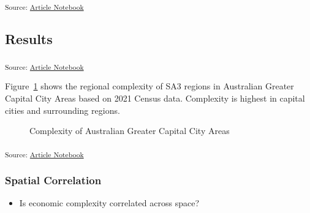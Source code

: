 \documentclass[
]{agujournal2019}
\providecommand{\tightlist}{%
  \setlength{\itemsep}{0pt}\setlength{\parskip}{0pt}}\usepackage{longtable,booktabs,array}
\begin{document}
\textsubscript{Source:
\href{https://aiti-flinders.github.io/sirp-complexity/index-preview.html}{Article
Notebook}}

\subsection{Results}\label{results}

\textsubscript{Source:
\href{https://aiti-flinders.github.io/sirp-complexity/index-preview.html}{Article
Notebook}}

Figure~\ref{fig-gcc-complexity} shows the regional complexity of SA3
regions in Australian Greater Capital City Areas based on 2021 Census
data. Complexity is highest in capital cities and surrounding regions.

\label{cell-fig-gcc-complexity}
\begin{figure}[H]


\caption{\label{fig-gcc-complexity}Complexity of Australian Greater
Capital City Areas}

\end{figure}%

\textsubscript{Source:
\href{https://aiti-flinders.github.io/sirp-complexity/index-preview.html}{Article
Notebook}}

\subsubsection{Spatial Correlation}\label{spatial-correlation}

\begin{itemize}
\tightlist
\item
  Is economic complexity correlated across space?
\end{itemize}
\end{document}
